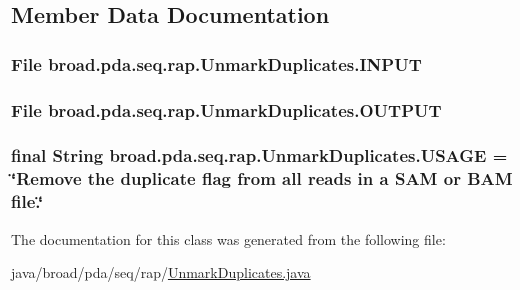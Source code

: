 \subsection{Member Data Documentation}
\hypertarget{classbroad_1_1pda_1_1seq_1_1rap_1_1_unmark_duplicates_af779c21595731e988fb21cefff20353f}{
\subsubsection[{I\+N\+P\+U\+T}]{\setlength{\rightskip}{0pt plus 5cm}File broad.\+pda.\+seq.\+rap.\+Unmark\+Duplicates.\+I\+N\+P\+U\+T}}\label{classbroad_1_1pda_1_1seq_1_1rap_1_1_unmark_duplicates_af779c21595731e988fb21cefff20353f}
\hypertarget{classbroad_1_1pda_1_1seq_1_1rap_1_1_unmark_duplicates_a6feeeb53aaf5750bba0b03f196e0c59a}{
\subsubsection[{O\+U\+T\+P\+U\+T}]{\setlength{\rightskip}{0pt plus 5cm}File broad.\+pda.\+seq.\+rap.\+Unmark\+Duplicates.\+O\+U\+T\+P\+U\+T}}\label{classbroad_1_1pda_1_1seq_1_1rap_1_1_unmark_duplicates_a6feeeb53aaf5750bba0b03f196e0c59a}
\hypertarget{classbroad_1_1pda_1_1seq_1_1rap_1_1_unmark_duplicates_a9a7c5588a9a90060bf4e9a794ffe0e7d}{
\subsubsection[{U\+S\+A\+G\+E}]{\setlength{\rightskip}{0pt plus 5cm}final String broad.\+pda.\+seq.\+rap.\+Unmark\+Duplicates.\+U\+S\+A\+G\+E = \char`\"{}Remove the duplicate flag from all reads in a S\+A\+M or B\+A\+M file.\char`\"{}}}\label{classbroad_1_1pda_1_1seq_1_1rap_1_1_unmark_duplicates_a9a7c5588a9a90060bf4e9a794ffe0e7d}


The documentation for this class was generated from the following file\+:\begin{DoxyCompactItemize}
\item 
java/broad/pda/seq/rap/\hyperlink{_unmark_duplicates_8java}{Unmark\+Duplicates.\+java}\end{DoxyCompactItemize}
